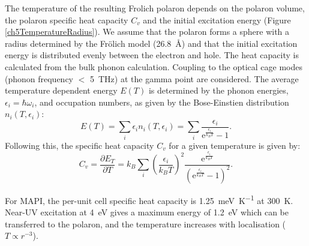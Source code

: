 \begin{table}
The temperature of the resulting Fr{\:o}lich polaron depends on the polaron volume, the polaron specific heat capacity $C_v$ and the initial excitation energy (Figure \ref{ch5TemperatureRadius}). We assume that the polaron forms a sphere with a radius determined by the Fr\"{o}lich model (\SI{26.8}{\angstrom}) and that the initial excitation energy is distributed evenly between the electron and hole. 
The heat capacity is calculated from the bulk phonon calculation. Coupling to the optical cage modes (phonon frequency $<$ \SI{5}{\tera\hertz}\autocite{Leguy2016}) at the gamma point are considered. The average temperature dependent energy $E(T)$ is determined by the phonon energies, $\epsilon_i = \hbar\omega_i$, and occupation numbers, as given by the Bose-Einstien distribution $n_i(T,\epsilon_i)$:
\begin{equation}
    E(T) = \sum_i \epsilon_i n_i(T,\epsilon_i) = \sum_i \frac{\epsilon_i}{\textrm{e}^{\frac{\epsilon_i}{k_BT}}-1}.
\end{equation}
Following this, the specific heat capacity $C_v$ for a given temperature is given by:
\begin{equation}
    C_v = \frac{\partial E_T}{\partial T} = k_B \sum_i \left(\frac{\epsilon_i}{k_BT}\right)^2 \frac{\textrm{e}^{\frac{\epsilon_i}{k_BT}}}{\left(\textrm{e}^{\frac{\epsilon_i}{k_BT}}-1\right)^2}.
\end{equation}

For MAPI, the per-unit cell specific heat capacity is \SI{1.25}{\milli\eV\per\K} at
\SI{300}{\K}. Near-UV excitation at \SI{4}{\eV} gives a maximum energy of \SI{1.2}{\eV} which can be transferred to the polaron, and the temperature increases with localisation ($T \propto r^{-3}$).


\end{table}
